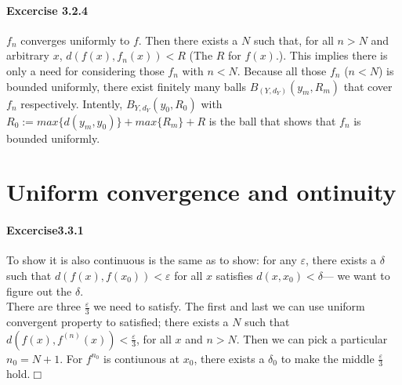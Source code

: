 \paragraph{Excercise 3.2.4} $f_{n}$ converges uniformly to $f$. Then there exists a $N$ such that, for all $n>N$ and arbitrary $x$, $d(f(x),f_{n}(x))<R$ (The $R$ for $f(x)$.). This implies there is only a need for considering those $f_{n}$ with $n<N$. Because all those $f_{n}$ ($n<N$) is bounded uniformly, there exist finitely many balls $B_{(Y,d_{Y})}(y_{m},R_{m})$ that cover $f_{n}$ respectively. Intently, $B_{Y,d_{Y}}(y_{0},R_{0})$ with $R_{0}:=max\{d(y_{m},y_{0})\}+max\{R_{m}\}+R$ is the ball that shows that $f_{n}$ is bounded uniformly.

\section{Uniform convergence and  ontinuity}
\paragraph{Excercise3.3.1} To show it is also continuous is the same as to show: for any $\varepsilon$, there exists a $\delta$ such that $d(f(x),f(x_{0}))<\varepsilon$ for all $x$ satisfies $d(x,x_{0})<\delta$--- we want to figure out the $\delta$. \\
There are three $\frac{\varepsilon}{3}$ we need to satisfy. The first and last we can use uniform convergent property to satisfied; there exists a $N$ such that $d(f(x),f^{(n)}(x))<\frac{\varepsilon}{3}$, for all $x$ and $n>N$. Then we can pick a particular $n_{0}=N+1$. For $f^{n_{0}}$ is contiunous at $x_{0}$, there exists a $\delta_{0}$ to make the middle $\frac{\varepsilon}{3}$ hold.$\Box$
